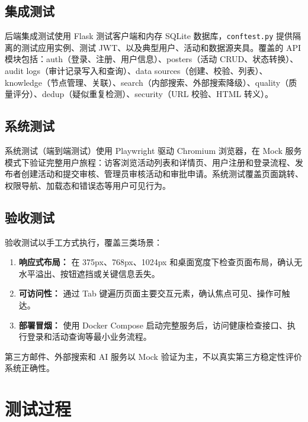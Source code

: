 \documentclass[12pt,a4paper]{ctexart}
\begin{document}
\subsection{集成测试}
后端集成测试使用 Flask 测试客户端和内存 SQLite 数据库，\texttt{conftest.py} 提供隔离的测试应用实例、测试 JWT、以及典型用户、活动和数据源夹具。覆盖的 API 模块包括：auth（登录、注册、用户信息）、posters（活动 CRUD、状态转换）、audit logs（审计记录写入和查询）、data sources（创建、校验、列表）、knowledge（节点管理、关联）、search（内部搜索、外部搜索降级）、quality（质量评分）、dedup（疑似重复检测）、security（URL 校验、HTML 转义）。

\subsection{系统测试}
系统测试（端到端测试）使用 Playwright 驱动 Chromium 浏览器，在 Mock 服务模式下验证完整用户旅程：访客浏览活动列表和详情页、用户注册和登录流程、发布者创建活动和提交审核、管理员审核活动和审批申请。系统测试覆盖页面跳转、权限导航、加载态和错误态等用户可见行为。

\subsection{验收测试}
验收测试以手工方式执行，覆盖三类场景：
\begin{enumerate}
\item \textbf{响应式布局：} 在 375px、768px、1024px 和桌面宽度下检查页面布局，确认无水平溢出、按钮遮挡或关键信息丢失。
\item \textbf{可访问性：} 通过 Tab 键遍历页面主要交互元素，确认焦点可见、操作可触达。
\item \textbf{部署冒烟：} 使用 Docker Compose 启动完整服务后，访问健康检查接口、执行登录和活动查询等最小业务流程。
\end{enumerate}
第三方邮件、外部搜索和 AI 服务以 Mock 验证为主，不以真实第三方稳定性评价系统正确性。

\section{测试过程}
\end{document}
